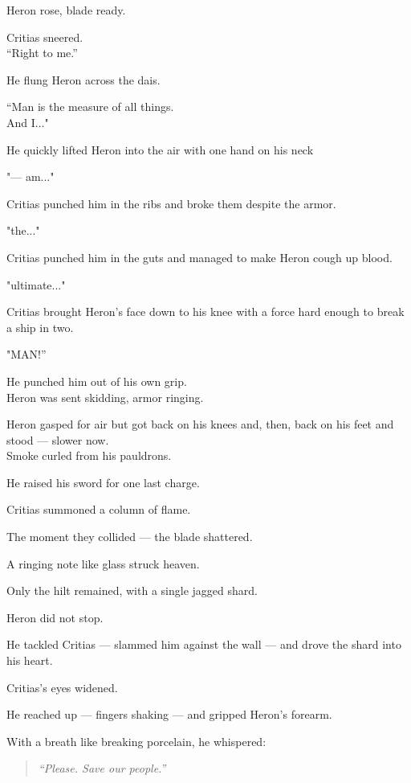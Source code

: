 \documentclass[12pt]{article}
\begin{document}
Heron rose, blade ready.

Critias sneered.\\
“Right to me.”

He flung Heron across the dais.

“Man is the measure of all things.\\
And I..."

He quickly lifted Heron into the air with one hand on his neck

"— am..."

Critias punched him in the ribs and broke them despite the armor.

"the..."

Critias punched him in the guts and managed to make Heron cough up blood.


"ultimate..."

Critias brought Heron's face down to his knee with a force hard enough to break a ship in two.

"MAN!”

He punched him out of his own grip.\\

Heron was sent skidding, armor ringing.

\vspace{1em}

Heron gasped for air but got back on his knees and, then, back on his feet and stood — slower now.\\
Smoke curled from his pauldrons.

He raised his sword for one last charge.

Critias summoned a column of flame.

The moment they collided — the blade shattered.

A ringing note like glass struck heaven.

Only the hilt remained, with a single jagged shard.

Heron did not stop.

He tackled Critias — slammed him against the wall — and drove the shard into his heart.

\vspace{1em}

Critias’s eyes widened.

He reached up — fingers shaking — and gripped Heron’s forearm.

With a breath like breaking porcelain, he whispered:

\begin{quote}
\textit{“Please. Save our people.”}
\end{quote}
\end{document}
